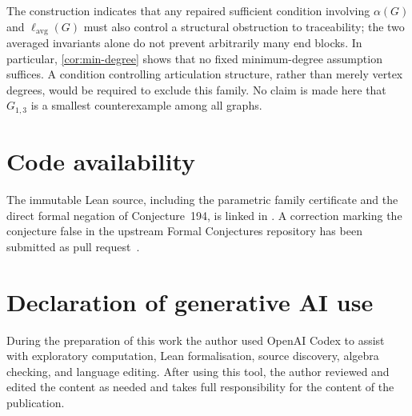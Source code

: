 \documentclass[11pt]{article}
\newcommand{\lavg}{\ell_{\mathrm{avg}}}
\begin{document}
The construction indicates that any repaired sufficient condition involving
$\alpha(G)$ and $\lavg(G)$ must also control a structural obstruction to traceability;
the two averaged invariants alone do not prevent arbitrarily many end blocks.  In
particular, \cref{cor:min-degree} shows that no fixed minimum-degree assumption suffices.
A condition controlling articulation structure, rather than merely vertex degrees, would
be required to exclude this family.  No claim is made here that $G_{1,3}$ is a smallest
counterexample among all graphs.

\section*{Code availability}
The immutable Lean source, including the parametric family certificate and the direct
formal negation of Conjecture~194, is linked in \cite{formalconjectures194}.  A correction
marking the conjecture false in the upstream Formal Conjectures repository has been
submitted as pull request~\cite{formalconjecturesPR}.

\section*{Declaration of generative AI use}
During the preparation of this work the author used OpenAI Codex to assist with exploratory
computation, Lean formalisation, source discovery, algebra checking, and language editing.
After using this tool, the author reviewed and edited the content as needed and takes full
responsibility for the content of the publication.
\end{document}
